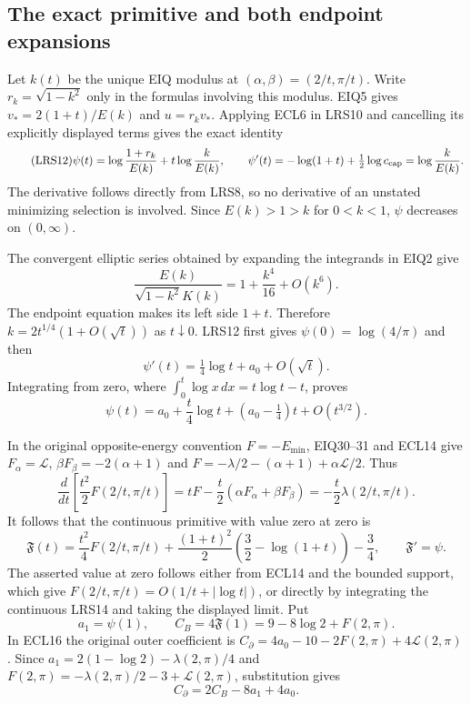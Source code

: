 \subsection{The exact primitive and both endpoint expansions}

Let $k(t)$ be the unique EIQ modulus at $(\alpha,\beta)=(2/t,\pi/t)$.
Write $r_k=\sqrt{1-k^2}$ only in the formulas involving this modulus.
EIQ5 gives $v_*=2(1+t)/E(k)$ and $u=r_kv_*$.  Applying ECL6 in
LRS10 and cancelling its explicitly displayed terms gives the exact
identity
\begin{equation}\tag{LRS12}
 \psi(t)=\log\frac{1+r_k}{E(k)}+t\log\frac{k}{E(k)},
 \qquad
 \psi'(t)=-\log(1+t)+\tfrac12\log c_{\rm cap}
             =\log\frac{k}{E(k)}.
\end{equation}
The derivative follows directly from LRS8, so no derivative of an
unstated minimizing selection is involved.  Since $E(k)>1>k$ for
$0<k<1$, $\psi$ decreases on $(0,\infty)$.

The convergent elliptic series obtained by expanding the integrands
in EIQ2 give
\[
 \frac{E(k)}{\sqrt{1-k^2}K(k)}
     =1+\frac{k^4}{16}+O(k^6).
\]
The endpoint equation makes its left side $1+t$.  Therefore
$k=2t^{1/4}(1+O(\sqrt t))$ as $t\downarrow0$.  LRS12 first gives
$\psi(0)=\log(4/\pi)$ and then
\begin{equation}\tag{LRS13}
 \psi'(t)=\tfrac14\log t+a_0+O(\sqrt t).
\end{equation}
Integrating from zero, where $\int_0^t\log x\,dx=t\log t-t$, proves
\begin{equation}\tag{LRS14}
 \psi(t)=a_0+\frac t4\log t+(a_0-\tfrac14)t+O(t^{3/2}).
\end{equation}

In the original opposite-energy convention $F=-E_{\min}$,
EIQ30--31 and ECL14 give
$F_\alpha=\mathcal L$, $\beta F_\beta=-2(\alpha+1)$ and
$F=-\lambda/2-(\alpha+1)+\alpha\mathcal L/2$.
Thus
\[
 \frac d{dt}\left[\frac{t^2}{2}F(2/t,\pi/t)\right]
   =tF-\frac t2(\alpha F_\alpha+\beta F_\beta)
   =-\frac t2\lambda(2/t,\pi/t).
\]
It follows that the continuous primitive with value zero at zero is
\begin{equation}\tag{LRS15}
 \mathfrak F(t)=\frac{t^2}{4}F(2/t,\pi/t)
 +\frac{(1+t)^2}{2}\left(\frac32-\log(1+t)\right)-\frac34,
 \qquad \mathfrak F'=\psi.
\end{equation}
The asserted value at zero follows either from ECL14 and the bounded
support, which give $F(2/t,\pi/t)=O(1/t+|\log t|)$, or directly by
integrating the continuous LRS14 and taking the displayed limit.
Put
\[
 a_1=\psi(1),\qquad C_B=4\mathfrak F(1)=9-8\log2+F(2,\pi).
\]
In ECL16 the original outer coefficient is
$C_\partial=4a_0-10-2F(2,\pi)+4\mathcal L(2,\pi)$.
Since $a_1=2(1-\log2)-\lambda(2,\pi)/4$ and
$F(2,\pi)=-\lambda(2,\pi)/2-3+\mathcal L(2,\pi)$, substitution gives
\begin{equation}\tag{LRS16}
 C_\partial=2C_B-8a_1+4a_0.
\end{equation}

